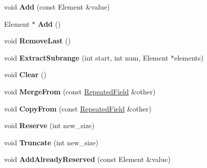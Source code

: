 \begin{DoxyCompactItemize}
void {\bfseries Add} (const Element \&value)
\item 
\mbox{\label{classgoogle_1_1protobuf_1_1RepeatedField_a657df33bc0934723b26b3ca67b08aaa6}} 
Element $\ast$ {\bfseries Add} ()
\item 
\mbox{\label{classgoogle_1_1protobuf_1_1RepeatedField_a3cf9e42bf09efc05b1ac1c228dc080fb}} 
void {\bfseries Remove\+Last} ()
\item 
\mbox{\label{classgoogle_1_1protobuf_1_1RepeatedField_a18be896cba399d287867dc37c648b544}} 
void {\bfseries Extract\+Subrange} (int start, int num, Element $\ast$elements)
\item 
\mbox{\label{classgoogle_1_1protobuf_1_1RepeatedField_a445b2f9a9c96e985f81a122ddf764b6b}} 
void {\bfseries Clear} ()
\item 
\mbox{\label{classgoogle_1_1protobuf_1_1RepeatedField_a2f2de1d26c3732724005274cd1af5985}} 
void {\bfseries Merge\+From} (const \hyperlink{classgoogle_1_1protobuf_1_1RepeatedField}{Repeated\+Field} \&other)
\item 
\mbox{\label{classgoogle_1_1protobuf_1_1RepeatedField_ae0a626c5a6a5809a80251b9a033d4254}} 
void {\bfseries Copy\+From} (const \hyperlink{classgoogle_1_1protobuf_1_1RepeatedField}{Repeated\+Field} \&other)
\item 
\mbox{\label{classgoogle_1_1protobuf_1_1RepeatedField_aef2fcf8789653833f1a49bf9f62f402a}} 
void {\bfseries Reserve} (int new\+\_\+size)
\item 
\mbox{\label{classgoogle_1_1protobuf_1_1RepeatedField_aec05e0b1eac6573023c3801238f56bbb}} 
void {\bfseries Truncate} (int new\+\_\+size)
\item 
\mbox{\label{classgoogle_1_1protobuf_1_1RepeatedField_a8f810e3166a98422abb1a93535d6bfc3}} 
void {\bfseries Add\+Already\+Reserved} (const Element \&value)

\end{DoxyCompactItemize}
